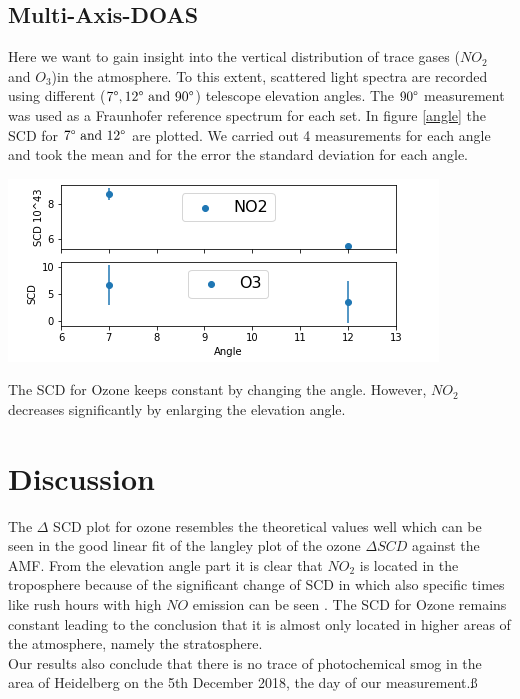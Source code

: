 \documentclass[12pt, english]{scrartcl} %
\newenvironment{Figure}
  {\par\medskip\noindent\minipage{\linewidth}}
  {\endminipage\par\medskip}
\begin{document}
\begin{multicols}{2}
\subsection{Multi-Axis-DOAS}
Here we want to gain insight into the vertical distribution of trace gases ($NO_2$ and $O_3$)in the atmosphere. To this extent, scattered light spectra are recorded using different ($7 \degree, 12 \degree \text{\ and\ } 90 \degree$) telescope elevation angles. The $90 \degree$ measurement was used as a Fraunhofer reference spectrum for each set. In figure \ref{angle} the SCD for $7 \degree \text{\ and\ } 12 \degree$ are plotted. We carried out 4 measurements for each angle and took the mean and for the error the standard deviation for each angle. 
\begin{Figure}
 \centering
 \captionsetup{format=plain}
 \includegraphics[width=\linewidth]{graphics/anglescd2.png}
  \label{angle}
\end{Figure}
The SCD for Ozone keeps constant by changing the angle. However, $NO_2$ decreases significantly by enlarging the elevation angle.
\section{Discussion}
The $\Delta$ SCD plot for ozone resembles the theoretical values well which can be seen in the good linear fit of the langley plot of the ozone $\Delta SCD$ against the AMF. 
From the elevation angle part it is clear that $NO_2$ is located in the troposphere because of the significant change of SCD in which also specific times like rush hours with high $NO$ emission can be seen . The SCD for Ozone remains constant leading to the conclusion that it is almost only located in higher areas of the atmosphere, namely the stratosphere.\\
Our results also conclude that there is no trace of photochemical smog in the area of Heidelberg on the 5th December 2018, the day of our measurement.ß 
\end{multicols}
\end{document}

